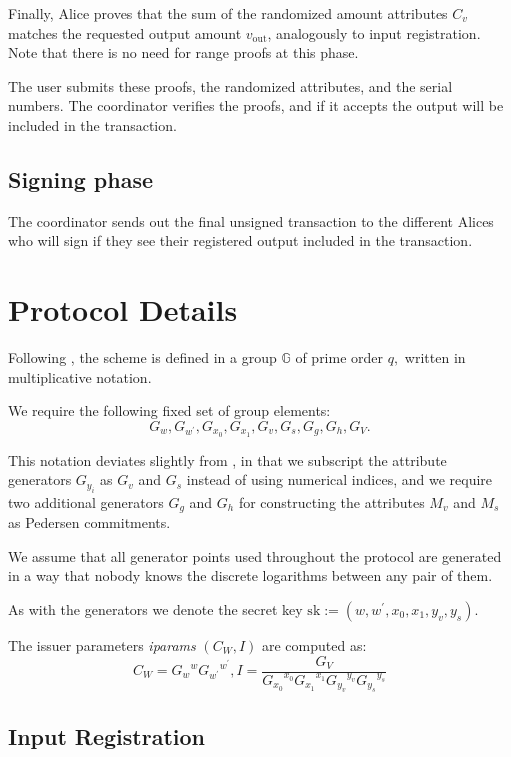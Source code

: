 \documentclass{article}
\begin{document}
Finally, Alice proves that the sum of the randomized amount attributes $C_v$ matches the requested output amount $v_{\mathrm{out}}$, analogously to input registration. Note that there is no need for range proofs at this phase.

The user submits these proofs, the randomized attributes, and the serial numbers. The coordinator verifies the proofs, and if it accepts the output will be included in the transaction.

\subsection{Signing phase}
The coordinator sends out the final unsigned transaction to the different Alices who will sign if they see their registered output included in the transaction.

\section{Protocol Details}

Following \cite{chase2019signal}, the scheme is defined in a group \(\mathbb{G}\) of prime order \(q,\) written in multiplicative notation.

We require the following fixed set of group elements:
\[
G_{w}, G_{w^{\prime}}, G_{x_{0}}, G_{x_{1}},
G_{v}, G_{s}, G_g, G_h,
G_{V}.
\]

This notation deviates slightly from \cite{chase2019signal}, in that we subscript the attribute generators $G_{y_i}$ as $G_v$ and $G_s$ instead of using numerical indices, and we require two additional generators $G_g$ and $G_h$ for constructing the attributes $M_v$ and $M_s$ as Pedersen commitments.

We assume that all generator points used throughout the protocol are generated in a way that nobody knows the discrete logarithms between any pair of them.

As with the generators we denote the secret key
\( \mathrm{sk} := \left(w, w^{\prime}, x_{0}, x_{1},y_{v}, y_{s}\right) \).

The issuer parameters \textit{iparams}
\( \left(C_{W}, I\right) \)
are computed as:
\[
C_{W}={G_w}^{w} {G_{w^\prime}}^{w^\prime},
I=\frac{G_{V}}{{G_{x_0}}^{x_0} {G_{x_1}}^{x_1} {G_{y_v}}^{y_v} {G_{y_s}}^{y_s}}
\]



\subsection{Input Registration}
\end{document}
